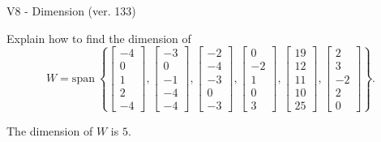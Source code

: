 \begin{exercise}
  \begin{exerciseTitle}V8 - Dimension (ver. 133)\end{exerciseTitle}
  \begin{exerciseStatement}
    Explain how to find the dimension of 
\[W=\mathrm{span}\ \left\{\left[\begin{array}{r}
-4 \\
0 \\
1 \\
2 \\
-4
\end{array}\right] , \left[\begin{array}{r}
-3 \\
0 \\
-1 \\
-4 \\
-4
\end{array}\right] , \left[\begin{array}{r}
-2 \\
-4 \\
-3 \\
0 \\
-3
\end{array}\right] , \left[\begin{array}{r}
0 \\
-2 \\
1 \\
0 \\
3
\end{array}\right] , \left[\begin{array}{r}
19 \\
12 \\
11 \\
10 \\
25
\end{array}\right] , \left[\begin{array}{r}
2 \\
3 \\
-2 \\
2 \\
0
\end{array}\right]\right\}.\]



  \end{exerciseStatement}
  \begin{exerciseAnswer}
   The dimension of \(W\) is  \(5\).
  


  \end{exerciseAnswer}
\end{exercise}